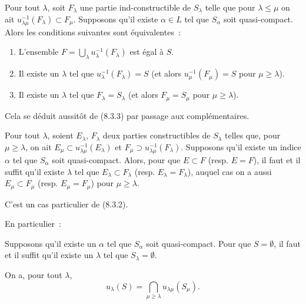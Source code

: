 \begin{corollary}[8.3.4]
\label{IV.8.3.4-fr}
Pour tout $\lambda$, soit $F_\lambda$ une partie ind-constructible de
$S_\lambda$ telle que pour $\lambda\leq\mu$ on ait
$u_{\lambda\mu}^{-1}(F_\lambda)\subset F_\mu$. Supposons qu'il existe
$\alpha\in L$ tel que $S_\alpha$ soit quasi-compact. Alors les conditions
suivantes sont équivalentes~:
\begin{enumerate}
\item[\emph{a)}] L'ensemble
$F=\bigcup_\lambda u_\lambda^{-1}(F_\lambda)$ est égal à $S$.
\item[\emph{b)}] Il existe un $\lambda$ tel que
$u_\lambda^{-1}(F_\lambda)=S$ (et alors
$u_\mu^{-1}(F_\mu)=S$ pour $\mu\geq\lambda$).
\item[\emph{c)}] Il existe un $\lambda$ tel que $F_\lambda=S_\lambda$ (et
alors $F_\mu=S_\mu$ pour $\mu\geq\lambda$).
\end{enumerate}
\end{corollary}

Cela se déduit aussitôt de (8.3.3) par passage aux complémentaires.

\begin{corollary}[8.3.5]
\label{IV.8.3.5-fr}
Pour tout $\lambda$, soient $E_\lambda$, $F_\lambda$ deux parties
constructibles de $S_\lambda$ telles que, pour $\mu\geq\lambda$, on ait
$E_\mu\subset u_{\lambda\mu}^{-1}(E_\lambda)$ et
$F_\mu\supset u_{\lambda\mu}^{-1}(F_\lambda)$. Supposons qu'il existe un
indice $\alpha$ tel que $S_\alpha$ soit quasi-compact. Alors, pour que
$E\subset F$ (resp. $E=F$), il faut et il suffit qu'il existe $\lambda$ tel
que $E_\lambda\subset F_\lambda$ (resp. $E_\lambda=F_\lambda$), auquel cas
on a aussi $E_\mu\subset F_\mu$ (resp. $E_\mu=F_\mu$) pour
$\mu\geq\lambda$.
\end{corollary}

C'est un cas particulier de (8.3.2).

En particulier~:

\begin{corollary}[8.3.6]
\label{IV.8.3.6-fr}
Supposons qu'il existe un $\alpha$ tel que $S_\alpha$ soit quasi-compact.
Pour que $S=\emptyset$, il faut et il suffit qu'il existe un $\lambda$ tel
que $S_\lambda=\emptyset$.
\end{corollary}

\begin{corollary}[8.3.7]
\label{IV.8.3.7-fr}
On a, pour tout $\lambda$,
\begin{equation}
u_\lambda(S)=\bigcap_{\mu\geq\lambda}u_{\lambda\mu}(S_\mu).
\tag{8.3.7.1}\label{IV.8.3.7.1-fr}
\end{equation}
\end{corollary}

